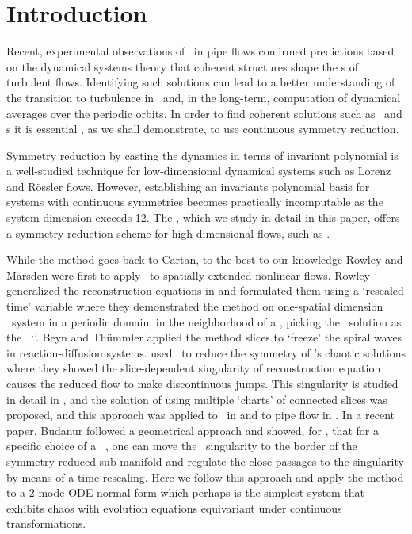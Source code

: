 \section{Introduction}
\label{s:intro}

Recent, experimental observations of \reqva\ in pipe flows confirmed
predictions based on the dynamical systems theory that coherent structures shape 
the \statesp s of turbulent flows. Identifying such solutions can lead to a better
understanding of the transition to turbulence in \NS\ and, in the long-term,
computation of dynamical averages over the periodic orbits. In order to
find coherent solutions such as \reqva\ and \rpo s it is essential , as we shall demonstrate, 
to use continuous symmetry reduction.

Symmetry reduction by casting the dynamics in terms of invariant polynomial is a well-studied technique for low-dimensional dynamical systems such 
as Lorenz and R\"{o}ssler flows. However, establishing an invariants polynomial basis for
systems with continuous symmetries becomes practically incomputable as the system dimension exceeds 12.
The \mslices%
,
which we study in detail in this paper, offers a symmetry reduction
scheme for high-dimensional flows, such as \NS.

While the method goes back to Cartan, to the
best to our knowledge Rowley and Marsden
were first to apply \mslices\ to spatially extended nonlinear flows. Rowley
\etal~ generalized the reconstruction equations
in and formulated them using a `rescaled
time' variable where they demonstrated the method on one-spatial dimension \KS\ system
in a periodic domain, in the neighborhood of a \reqv, picking
the \reqv\ solution as the \slice\ `\template'.  Beyn and
Th\"{u}mmler applied the method slices to `freeze' the spiral
waves in reaction-diffusion systems.
 used \mslices\ to reduce the  symmetry of
\cLf's chaotic solutions where they showed the slice-dependent
singularity of reconstruction equation causes the reduced flow to make
discontinuous jumps. This singularity is studied in detail in
, and the solution of using multiple `charts' of connected
slices was proposed, and this approach was applied to \cLf\
in  and to pipe flow in . In a
recent paper, Budanur \etal{} followed a geometrical approach
and showed, for \SOn{2}, that for a specific choice of a \slice\
\template , one can move the \slice\ singularity to the border of the
symmetry-reduced sub-manifold and regulate the close-passages to the
singularity by means of a time rescaling. Here we follow this approach
and apply the method to a 2-mode  ODE normal form which perhaps is
the simplest system that exhibits chaos with evolution equations
equivariant under continuous \SOn{2} transformations.


